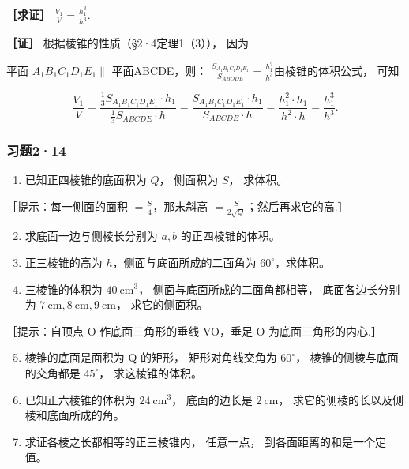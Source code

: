 \textbf{［求证］} \(\frac{V_1}{V} = \frac{h_1^3}{h^3}\).

\textbf{［证］} 根据棱锥的性质（§2·4定理1（3））， 因为

平面 \(A_{1}B_{1}C_{1}D_{1}E_{1}\parallel\) 平面ABCDE，则：
\(\frac{S_{A_1B_1C_1D_1E_1}}{S_{ABODE}} = \frac{h_1^2}{h^3}\)由棱锥的体积公式，
可知

\[
\frac {V _ {1}}{V} = \frac {\frac {1}{3} S _ {A _ {1} B _ {1} C _ {1} D _ {1} E _ {1}} \cdot h _ {1}}{\frac {1}{3} S _ {A B C D E} \cdot h} = \frac {S _ {A _ {1} B _ {1} C _ {1} D _ {1} E _ {1}} \cdot h _ {1}}{S _ {A B C D E} \cdot h} = \frac {h _ {1} ^ {2} \cdot h _ {1}}{h ^ {2} \cdot h} = \frac {h _ {1} ^ {3}}{h ^ {3}}.
\]

\subsubsection{习题2·14}

\begin{enumerate}
\item
  已知正四棱锥的底面积为 \(Q\)， 侧面积为 \(S\)， 求体积。
\end{enumerate}

［提示：每一侧面的面积 \(= \frac{S}{4}\)，那末斜高
\(= \frac{S}{2\sqrt{Q}}\)；然后再求它的高.］

\begin{enumerate}
\setcounter{enumi}{1}
\item
  求底面一边与侧棱长分别为 \(a, b\) 的正四棱锥的体积。
\item
  正三棱锥的高为 \(h\)，侧面与底面所成的二面角为
  \(60^{\circ}\)，求体积。
\item
  三棱锥的体积为 \(40 \mathrm{~cm}^{3}\)，
  侧面与底面所成的二面角都相等， 底面各边长分别为
  \(7 \mathrm{~cm}, 8 \mathrm{~cm}, 9 \mathrm{~cm}\)， 求它的侧面积。
\end{enumerate}

［提示：自顶点 O 作底面三角形的垂线 VO，垂足 O 为底面三角形的内心.］

\begin{enumerate}
\setcounter{enumi}{4}
\item
  棱锥的底面是面积为 Q 的矩形， 矩形对角线交角为 \(60^{\circ}\)，
  棱锥的侧棱与底面的交角都是 \(45^{\circ}\)， 求这棱锥的体积。
\item
  已知正六棱锥的体积为 \(24 \mathrm{~cm}^{3}\)， 底面的边长是
  \(2 \mathrm{~cm}\)， 求它的侧棱的长以及侧棱和底面所成的角。
\item
  求证各棱之长都相等的正三棱锥内， 任意一点， 到各面距离的和是一个定值。
\end{enumerate}

